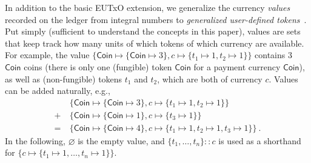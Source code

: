 %
In addition to the basic EUTxO extension, we generalize the
currency \emph{values} recorded on the ledger from integral numbers to \emph{generalized
  user-defined tokens}~\cite{eutxo-2}.
Put simply (sufficient to understand the concepts in this paper),
values are sets that keep track how many units of which tokens of
which currency are available.  For example, the value
$\{\mathsf{Coin} \mapsto \{\mathsf{Coin} \mapsto 3\}, c \mapsto \{t_1
\mapsto 1, t_2 \mapsto 1\}\}$ contains $3$ $\mathsf{Coin}$ coins
(there is only one (fungible) token $\mathsf{Coin}$ for a payment
currency $\mathsf{Coin}$), as well as (non-fungible) tokens $t_1$ and $t_2$, which
are both of currency $c$.  Values can be added naturally, e.g.,
\begin{align*}
  & \{\mathsf{Coin} \mapsto \{\mathsf{Coin} \mapsto 3\}, c \mapsto \{t_1
    \mapsto 1, t_2 \mapsto 1\}\} \\
  + \ & \{\mathsf{Coin} \mapsto \{\mathsf{Coin} \mapsto 1\}, c \mapsto \{t_3 \mapsto 1\}\} \\
  = \ & \{\mathsf{Coin} \mapsto \{\mathsf{Coin} \mapsto 4\}, c \mapsto \{t_1
        \mapsto 1, t_2 \mapsto 1, t_3 \mapsto 1\}\} \ .
\end{align*}
%
In the following, $\varnothing$ is the empty value, and
\(\{t_1, \ldots, t_n\} :: c\) is used as a shorthand for
\(\{c \mapsto \{t_1 \mapsto 1, \ldots, t_n \mapsto 1\}\}\).





